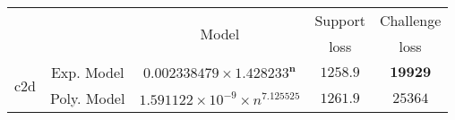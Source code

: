 \begin{tabular}{ccccc} 
\hline 
 &  & \multirow{2}{*}{Model} & Support & Challenge\tabularnewline 
 &  &  & loss  & loss\tabularnewline 
\hline 
\hline 
\multirow{2}{*}{c2d} & Exp. Model & $\mathbf{0.002338479\times 1.428233^{n}}$ & $\mathbf{1258.9}$ & $\mathbf{19929}$ \tabularnewline 
 & Poly. Model & $1.591122\times10^{-9}\times n^{7.125525}$ & $1261.9$ & $25364$ \tabularnewline 
\hline 
\end{tabular} 

